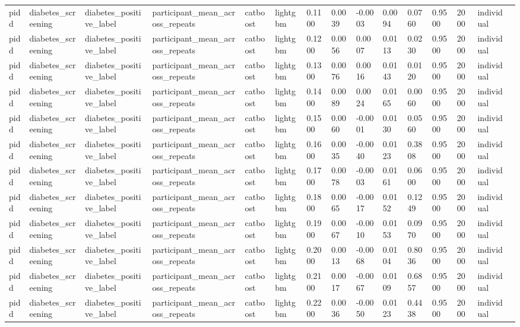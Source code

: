 \begin{tabular}{lllllllllllllll}
pidd & diabetes\_screening & diabetes\_positive\_label & participant\_mean\_across\_repeats & catboost & lightgbm & 0.1100 & 0.0039 & -0.0003 & 0.0094 & 0.0760 & 0.9500 & 2000 & individual &  \\
pidd & diabetes\_screening & diabetes\_positive\_label & participant\_mean\_across\_repeats & catboost & lightgbm & 0.1200 & 0.0056 & 0.0007 & 0.0113 & 0.0230 & 0.9500 & 2000 & individual &  \\
pidd & diabetes\_screening & diabetes\_positive\_label & participant\_mean\_across\_repeats & catboost & lightgbm & 0.1300 & 0.0076 & 0.0016 & 0.0143 & 0.0120 & 0.9500 & 2000 & individual &  \\
pidd & diabetes\_screening & diabetes\_positive\_label & participant\_mean\_across\_repeats & catboost & lightgbm & 0.1400 & 0.0089 & 0.0024 & 0.0165 & 0.0060 & 0.9500 & 2000 & individual &  \\
pidd & diabetes\_screening & diabetes\_positive\_label & participant\_mean\_across\_repeats & catboost & lightgbm & 0.1500 & 0.0060 & -0.0001 & 0.0130 & 0.0560 & 0.9500 & 2000 & individual &  \\
pidd & diabetes\_screening & diabetes\_positive\_label & participant\_mean\_across\_repeats & catboost & lightgbm & 0.1600 & 0.0035 & -0.0040 & 0.0123 & 0.3808 & 0.9500 & 2000 & individual &  \\
pidd & diabetes\_screening & diabetes\_positive\_label & participant\_mean\_across\_repeats & catboost & lightgbm & 0.1700 & 0.0078 & -0.0003 & 0.0161 & 0.0600 & 0.9500 & 2000 & individual &  \\
pidd & diabetes\_screening & diabetes\_positive\_label & participant\_mean\_across\_repeats & catboost & lightgbm & 0.1800 & 0.0065 & -0.0017 & 0.0152 & 0.1249 & 0.9500 & 2000 & individual &  \\
pidd & diabetes\_screening & diabetes\_positive\_label & participant\_mean\_across\_repeats & catboost & lightgbm & 0.1900 & 0.0067 & -0.0010 & 0.0153 & 0.0970 & 0.9500 & 2000 & individual &  \\
pidd & diabetes\_screening & diabetes\_positive\_label & participant\_mean\_across\_repeats & catboost & lightgbm & 0.2000 & 0.0013 & -0.0068 & 0.0104 & 0.8036 & 0.9500 & 2000 & individual &  \\
pidd & diabetes\_screening & diabetes\_positive\_label & participant\_mean\_across\_repeats & catboost & lightgbm & 0.2100 & 0.0017 & -0.0067 & 0.0109 & 0.6857 & 0.9500 & 2000 & individual &  \\
pidd & diabetes\_screening & diabetes\_positive\_label & participant\_mean\_across\_repeats & catboost & lightgbm & 0.2200 & 0.0036 & -0.0050 & 0.0123 & 0.4438 & 0.9500 & 2000 & individual &  \\

\end{tabular}
